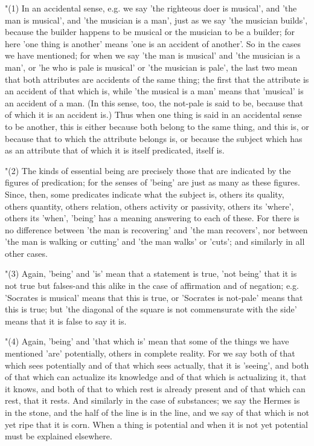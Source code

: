 "(1) In an accidental sense, e.g. we say 'the righteous doer is musical',
and 'the man is musical', and 'the musician is a man', just as we
say 'the musician builds', because the builder happens to be musical
or the musician to be a builder; for here 'one thing is another' means
'one is an accident of another'. So in the cases we have mentioned;
for when we say 'the man is musical' and 'the musician is a man',
or 'he who is pale is musical' or 'the musician is pale', the last
two mean that both attributes are accidents of the same thing; the
first that the attribute is an accident of that which is, while 'the
musical is a man' means that 'musical' is an accident of a man. (In
this sense, too, the not-pale is said to be, because that of which
it is an accident is.) Thus when one thing is said in an accidental
sense to be another, this is either because both belong to the same
thing, and this is, or because that to which the attribute belongs
is, or because the subject which has as an attribute that of which
it is itself predicated, itself is. 

"(2) The kinds of essential being are precisely those that are indicated
by the figures of predication; for the senses of 'being' are just
as many as these figures. Since, then, some predicates indicate what
the subject is, others its quality, others quantity, others relation,
others activity or passivity, others its 'where', others its 'when',
'being' has a meaning answering to each of these. For there is no
difference between 'the man is recovering' and 'the man recovers',
nor between 'the man is walking or cutting' and 'the man walks' or
'cuts'; and similarly in all other cases. 

"(3) Again, 'being' and 'is' mean that a statement is true, 'not being'
that it is not true but falses-and this alike in the case of affirmation
and of negation; e.g. 'Socrates is musical' means that this is true,
or 'Socrates is not-pale' means that this is true; but 'the diagonal
of the square is not commensurate with the side' means that it is
false to say it is. 

"(4) Again, 'being' and 'that which is' mean that some of the things
we have mentioned 'are' potentially, others in complete reality. For
we say both of that which sees potentially and of that which sees
actually, that it is 'seeing', and both of that which can actualize
its knowledge and of that which is actualizing it, that it knows,
and both of that to which rest is already present and of that which
can rest, that it rests. And similarly in the case of substances;
we say the Hermes is in the stone, and the half of the line is in
the line, and we say of that which is not yet ripe that it is corn.
When a thing is potential and when it is not yet potential must be
explained elsewhere. 

